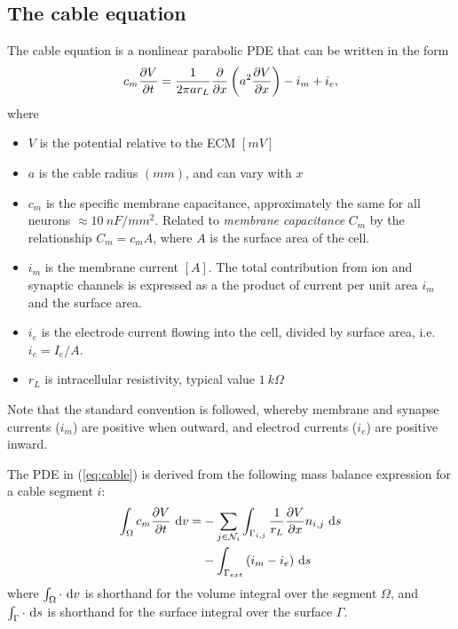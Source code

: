 \subsection{The cable equation}
The cable equation is a nonlinear parabolic PDE that can be written in the form
\begin{equation}
    \label{eq:cable}
    c_m \frac{\partial{V}}{\partial{t}} = \frac{1}{2\pi a r_{L}} \frac{\partial{}}{\partial{x}} \left( a^2 \frac{\partial{V}}{\partial{x}} \right) - i_m + i_e,
\end{equation}
where
\begin{itemize}
    \item $V$ is the potential relative to the ECM $[mV]$
    \item $a$ is the cable radius $(mm)$, and can vary with $x$
    \item $c_m$ is the {specific membrane capacitance}, approximately the same for all neurons $\approx 10~nF/mm^2$. Related to \emph{membrane capacitance} $C_m$ by the relationship $C_m=c_{m}A$, where $A$ is the surface area of the cell.
    \item $i_m$ is the membrane current $[A]$. The total contribution from ion and synaptic channels is expressed as a the product of current per unit area $i_m$ and the surface area.
    \item $i_e$ is the electrode current flowing into the cell, divided by surface area, i.e. $i_e=I_e/A$.
    \item $r_L$ is intracellular resistivity, typical value $1~k\Omega$
\end{itemize}

Note that the standard convention is followed, whereby membrane and synapse currents ($i_m$) are positive when outward, and electrod currents ($i_e$) are positive inward.

The PDE in (\ref{eq:cable}) is derived from the following mass balance expression for a cable segment $i$:
\begin{align}
    \int_{\Omega}{c_m \frac{\partial{V}}{\partial{t}} } ~\text{d}{v} =
        & - \sum_{j\in\mathcal{N}_i} {\int_{\Gamma_{i,j}} \frac{1}{r_L}\frac{\partial{V}}{\partial{x}} n_{i,j} ~\text{d}{s} } \nonumber \\
        & - \int_{\Gamma_{ext}} {(i_m - i_e)} ~\text{d}{s}
    \label{eq:cable_balance}
\end{align}
where $\int_\Omega \cdot ~\text{d}{v}$ is shorthand for the volume  integral over the segment $\Omega$, and $\int_\Gamma \cdot ~\text{d}{s}$ is shorthand for the surface integral over the surface $\Gamma$.

